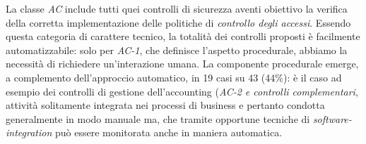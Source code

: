La classe \textit{AC} include tutti quei controlli di sicurezza aventi obiettivo la verifica della corretta implementazione delle politiche di \textit{controllo degli accessi}.
Essendo questa categoria di carattere tecnico, la totalità dei controlli proposti è facilmente automatizzabile: solo per \textit{AC-1}, che definisce l'aspetto procedurale, abbiamo la necessità di richiedere un'interazione umana.
La componente procedurale emerge, a complemento dell'approccio automatico, in 19 casi su 43 (44\%): è il caso ad esempio dei controlli di gestione dell'accounting (\textit{AC-2 e controlli complementari}, attività solitamente integrata nei processi di business e pertanto condotta generalmente in modo manuale ma, che tramite opportune tecniche di \textit{software-integration} può essere monitorata anche in maniera automatica.


